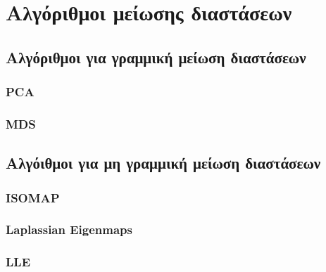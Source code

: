 
\chapter{Αλγόριθμοι μείωσης διαστάσεων}

\section{Αλγόριθμοι για γραμμική μείωση διαστάσεων}
\subsection{\textlatin{PCA}}
\subsection{\textlatin{MDS}}

\section{Αλγόιθμοι για μη γραμμική μείωση διαστάσεων}
\subsection{\textlatin{ISOMAP}}
\subsection{\textlatin{Laplassian Eigenmaps}}
\subsection{\textlatin{LLE}}
